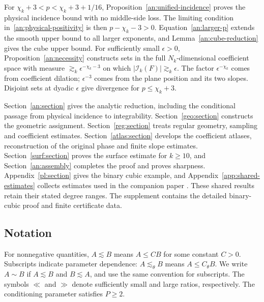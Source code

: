\documentclass[11pt]{amsart}
\theoremstyle{definition}
\theoremstyle{remark}
\numberwithin{equation}{section}
\begin{document}
For $\chi_k+3<p<\chi_k+3+1/16$, Proposition~\ref{an:unified-incidence} proves the physical incidence bound with no middle-side loss. The limiting condition in~\eqref{an:physical-positivity} is then $p-\chi_k-3>0$. Equation~\eqref{an:larger-p} extends the smooth upper bound to all larger exponents, and Lemma~\ref{an:cube-reduction} gives the cube upper bound. For sufficiently small $\epsilon>0$, Proposition~\ref{an:necessity} constructs sets in the full $N_k$-dimensional coefficient space with measure $\gtrsim_k\epsilon^{-\chi_k-3}$ on which $|\mathcal I_k(F)|\gtrsim_k\epsilon$. The factor $\epsilon^{-\chi_k}$ comes from coefficient dilation; $\epsilon^{-3}$ comes from the plane position and its two slopes. Disjoint sets at dyadic $\epsilon$ give divergence for $p\le\chi_k+3$.

Section~\ref{an:section} gives the analytic reduction, including the conditional passage from physical incidence to integrability. Section~\ref{geo:section} constructs the geometric assignment. Section~\ref{reg:section} treats regular geometry, sampling and coefficient estimates. Section~\ref{atlas:section} develops the coefficient atlases, reconstruction of the original phase and finite slope estimates. Section~\ref{surf:section} proves the surface estimate for $k\ge10$, and Section~\ref{an:assembly} completes the proof and proves sharpness. Appendix~\ref{pl:section} gives the binary cubic example, and Appendix~\ref{app:shared-estimates} collects estimates used in the companion paper \cite{PaperII}. These shared results retain their stated degree ranges. The supplement \cite{PaperSupplement} contains the detailed binary-cubic proof and finite certificate data.

\subsection*{Notation}

For nonnegative quantities, $A\lesssim B$ means $A\le CB$ for some constant $C>0$. Subscripts indicate parameter dependence: $A\lesssim_\theta B$ means $A\le C_\theta B$. We write $A\sim B$ if $A\lesssim B$ and $B\lesssim A$, and use the same convention for subscripts. The symbols $\ll$ and $\gg$ denote sufficiently small and large ratios, respectively. The conditioning parameter satisfies $P\ge2$.
\end{document}
